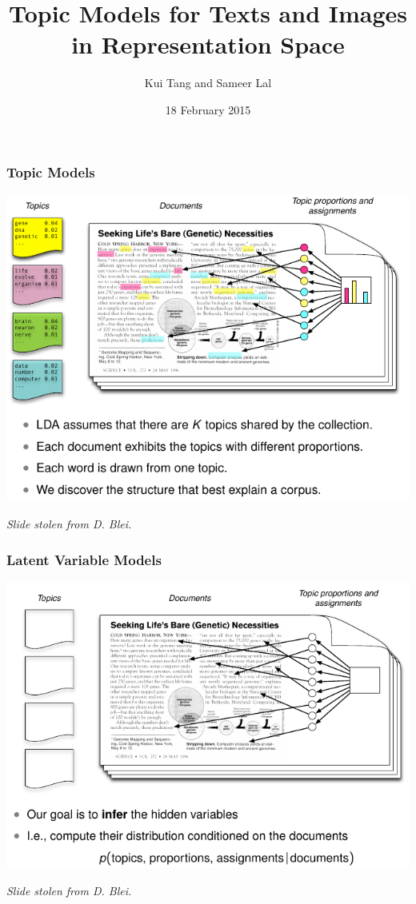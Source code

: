 \documentclass{beamer}
\title{Topic Models for Texts and Images in Representation Space}
\author{Kui Tang and Sameer Lal}
\institute{Columbia University}
\date{18 February 2015}
\begin{document}
\frame{\titlepage}

\begin{frame}
  \frametitle{Topic Models}
  {\centering \includegraphics[width=\textwidth]{assets/lda_colors.pdf}}
  {\small \emph{Slide stolen from D. Blei.} \par}
\end{frame}

\begin{frame}
  \frametitle{Latent Variable Models}
  {\centering \includegraphics[width=\textwidth]{assets/lda_hidden.pdf}}
  {\small \emph{Slide stolen from D. Blei.} \par}
\end{frame}
\end{document}
